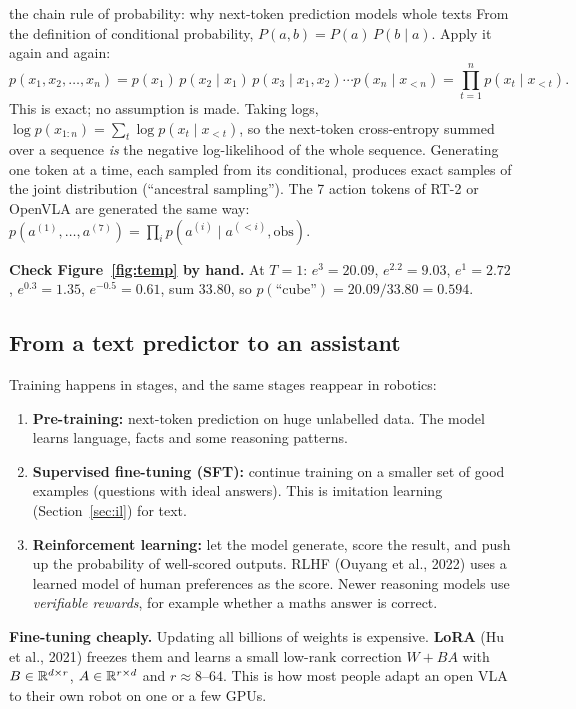 \begin{probbox}{the chain rule of probability: why next-token prediction models whole texts}
From the definition of conditional probability, $P(a,b)=P(a)\,P(b\mid a)$. Apply it again and again:
\[
p(x_1,x_2,\dots,x_n)=p(x_1)\,p(x_2\mid x_1)\,p(x_3\mid x_1,x_2)\cdots p(x_n\mid x_{<n})=\prod_{t=1}^n p(x_t\mid x_{<t}).
\]
This is exact; no assumption is made. Taking logs, $\log p(x_{1:n})=\sum_t\log p(x_t\mid x_{<t})$, so the next-token cross-entropy summed over a sequence \emph{is} the negative log-likelihood of the whole sequence. Generating one token at a time, each sampled from its conditional, produces exact samples of the joint distribution (``ancestral sampling''). The 7 action tokens of RT-2 or OpenVLA are generated the same way: $p(a^{(1)},\dots,a^{(7)})=\prod_i p(a^{(i)}\mid a^{(<i)},\text{obs})$.

\textbf{Check Figure~\ref{fig:temp} by hand.} At $T=1$: $e^{3}=20.09$, $e^{2.2}=9.03$, $e^{1}=2.72$, $e^{0.3}=1.35$, $e^{-0.5}=0.61$, sum $33.80$, so $p(\text{``cube''})=20.09/33.80=0.594$.
\end{probbox}

\subsection{From a text predictor to an assistant}
Training happens in stages, and the same stages reappear in robotics:
\begin{enumerate}
\item \textbf{Pre-training:} next-token prediction on huge unlabelled data. The model learns language, facts and some reasoning patterns.
\item \textbf{Supervised fine-tuning (SFT):} continue training on a smaller set of good examples (questions with ideal answers). This is imitation learning (Section~\ref{sec:il}) for text.
\item \textbf{Reinforcement learning:} let the model generate, score the result, and push up the probability of well-scored outputs. RLHF (Ouyang et al., 2022) uses a learned model of human preferences as the score. Newer reasoning models use \emph{verifiable rewards}, for example whether a maths answer is correct.
\end{enumerate}
\textbf{Fine-tuning cheaply.} Updating all billions of weights is expensive. \textbf{LoRA} (Hu et al., 2021) freezes them and learns a small low-rank correction $W+BA$ with $B\in\mathbb{R}^{d\times r}$, $A\in\mathbb{R}^{r\times d}$ and $r\approx 8$--$64$. This is how most people adapt an open VLA to their own robot on one or a few GPUs.

